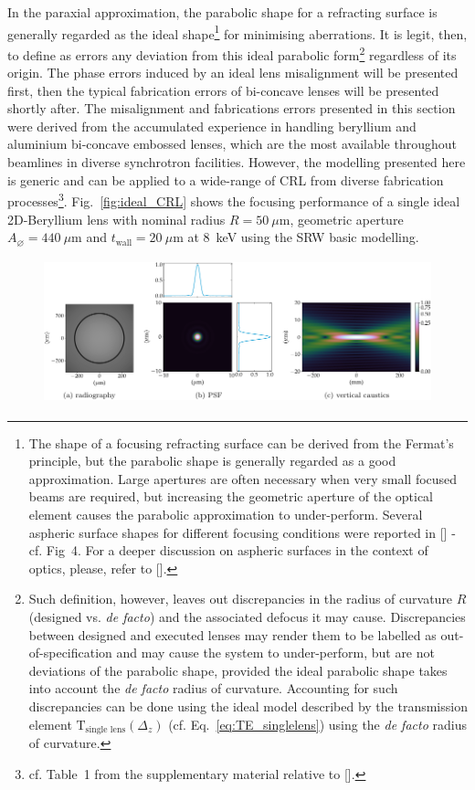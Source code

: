 \begin{refsection}
In the paraxial approximation, the parabolic shape for a refracting surface is generally regarded as the ideal shape\footnote{The shape of a focusing refracting surface can be derived from the Fermat's principle, but the parabolic shape is generally regarded as a good approximation. Large apertures are often necessary when very small focused beams are required, but increasing the geometric aperture of the optical element causes the parabolic approximation to under-perform. Several aspheric surface shapes for different focusing conditions were reported in [\cite{SanchezdelRio2012}] - cf. Fig~4. For a deeper discussion on aspheric surfaces in the context of optics, please, refer to [\cite{Schulz1988}].} for minimising aberrations. It is legit, then, to define as errors any deviation from this ideal parabolic form\footnote{Such definition, however, leaves out discrepancies in the radius of curvature $R$ (designed vs. \textit{de facto}) and the associated defocus it may cause. Discrepancies between designed and executed lenses may render them to be labelled as out-of-specification and may cause the system to under-perform, but are not deviations of the parabolic shape, provided the ideal parabolic shape takes into account the \textit{de facto} radius of curvature. Accounting for such discrepancies can be done using the ideal model described by the transmission element $\mathrm{T}_{\text{single lens}}(\Delta_z)$ (cf. Eq.~\ref{eq:TE_singlelens}) using the \textit{de facto} radius of curvature.} regardless of its origin. The phase errors induced by an ideal lens misalignment will be presented first, then the typical fabrication errors of bi-concave lenses will be presented shortly after. The misalignment and fabrications errors presented in this section were derived from the accumulated experience in handling beryllium and aluminium bi-concave embossed lenses, which are the most available throughout beamlines in diverse synchrotron facilities. However, the modelling presented here is generic and can be applied to a wide-range of CRL from diverse fabrication processes\footnote{cf. Table~1 from the supplementary material relative to [\cite{Roth2017}].}. Fig.~\ref{fig:ideal_CRL} shows the focusing performance of a single ideal 2D-Beryllium lens with nominal radius $R=50~\mu\text{m}$, geometric aperture $A_{\diameter}=440~\mu\text{m}$ and $t_\text{wall}=20~\mu$m at 8~keV using the SRW basic modelling. 
 \begin{figure}[t]
        \centering
        {\includegraphics[height=4.19cm]{figures/ch04/CRL_ideal.pdf}}

\end{figure}
\end{refsection}
